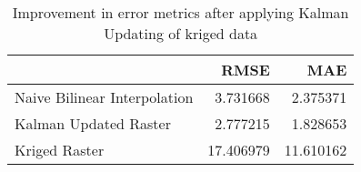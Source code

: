 \begin{table}
\caption{Improvement in error metrics after applying Kalman Updating of kriged data}
\label{tab:oahu3_gebco_raster_error}
\begin{tabular}{lrr}
\toprule
 & RMSE & MAE \\
\midrule
Naive Bilinear Interpolation & 3.731668 & 2.375371 \\
Kalman Updated Raster & 2.777215 & 1.828653 \\
Kriged Raster & 17.406979 & 11.610162 \\
\bottomrule
\end{tabular}
\end{table}
